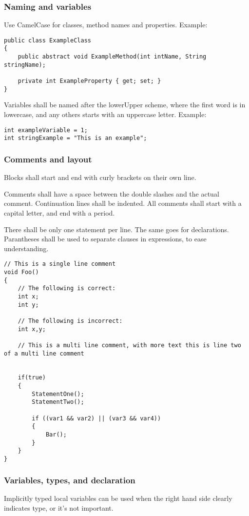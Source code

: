 \subsubsection{Naming and variables}
Use CamelCase for classes, method names and properties.
Example:
\begin{lstlisting}
public class ExampleClass
{
	public abstract void ExampleMethod(int intName, String stringName);
	
	private int ExampleProperty { get; set; }
}
\end{lstlisting}

Variables shall be named after the lowerUpper scheme, where the first word is in lowercase, and any others starts with an uppercase letter.
Example:\\
\begin{lstlisting}
int exampleVariable = 1;
int stringExample = "This is an example";
\end{lstlisting}

\subsubsection{Comments and layout}
Blocks shall start and end with curly brackets on their own line.

Comments shall have a space between the double slashes and the actual comment. Continuation lines shall be indented. All comments shall start with a capital letter, and end with a period.

There shall be only one statement per line. The same goes for declarations. Parantheses shall be used to separate clauses in expressions, to ease understanding.

\begin{lstlisting}
// This is a single line comment
void Foo()
{
	// The following is correct:
	int x;
	int y;
	
	// The following is incorrect:
	int x,y;
	
	// This is a multi line comment, with more text this is line two of a multi line comment

	
	if(true)
	{
		StatementOne();
		StatementTwo();
		
		if ((var1 && var2) || (var3 && var4))
		{
			Bar();
		}
	}
}
\end{lstlisting}

\subsubsection{Variables, types, and declaration}
Implicitly typed local variables can be used when the right hand side clearly indicates type, or it's not important.

